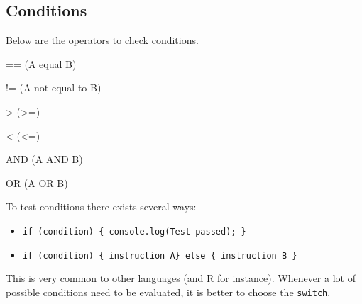 \documentclass[
]{book}
\newenvironment{Shaded}{\begin{snugshade}}{\end{snugshade}}
\newcommand{\AttributeTok}[1]{\textcolor[rgb]{0.77,0.63,0.00}{#1}}
\newcommand{\CommentTok}[1]{\textcolor[rgb]{0.56,0.35,0.01}{\textit{#1}}}
\newcommand{\DecValTok}[1]{\textcolor[rgb]{0.00,0.00,0.81}{#1}}
\newcommand{\KeywordTok}[1]{\textcolor[rgb]{0.13,0.29,0.53}{\textbf{#1}}}
\newcommand{\NormalTok}[1]{#1}
\newcommand{\OperatorTok}[1]{\textcolor[rgb]{0.81,0.36,0.00}{\textbf{#1}}}
\newcommand{\SpecialCharTok}[1]{\textcolor[rgb]{0.00,0.00,0.00}{#1}}
\newcommand{\VariableTok}[1]{\textcolor[rgb]{0.00,0.00,0.00}{#1}}
\newcommand{\VerbatimStringTok}[1]{\textcolor[rgb]{0.31,0.60,0.02}{#1}}
\providecommand{\tightlist}{%
  \setlength{\itemsep}{0pt}\setlength{\parskip}{0pt}}
\begin{document}
\begin{Shaded}
\end{Shaded}

\hypertarget{conditions}{%
\subsection{Conditions}\label{conditions}}

Below are the operators to check conditions.

== (A equal B)

!= (A not equal to B)

\textgreater{} (\textgreater=)

\textless{} (\textless=)

AND (A AND B)

OR (A OR B)

To test conditions there exists several ways:

\begin{itemize}
\tightlist
\item
  \texttt{if\ (condition)\ \{\ console.log(\textquotesingle{}Test\ passed\textquotesingle{});\ \}}
\item
  \texttt{if\ (condition)\ \{\ instruction\ A\}\ else\ \{\ instruction\ B\ \}}
\end{itemize}

This is very common to other languages (and R for instance). Whenever a lot of possible conditions need to be evaluated, it is better to choose the \texttt{switch}.
\end{document}
